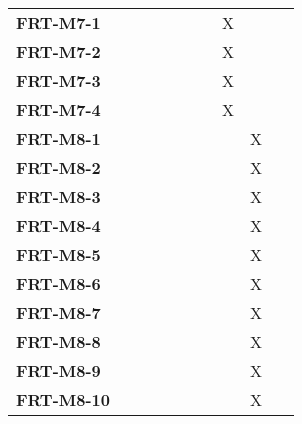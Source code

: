 \documentclass[12pt, titlepage]{article}
\begin{document}
\begin{longtable}{|l|ccccccc|}
	\textbf{FRT-M7-1}  & ~                                        & ~           & ~           & ~           & X           & ~           & ~           \\
	\textbf{FRT-M7-2}  & ~                                        & ~           & ~           & ~           & X           & ~           & ~           \\
	\textbf{FRT-M7-3}  & ~                                        & ~           & ~           & ~           & X           & ~           & ~           \\
	\textbf{FRT-M7-4}  & ~                                        & ~           & ~           & ~           & X           & ~           & ~           \\
	\textbf{FRT-M8-1}  & ~                                        & ~           & ~           & ~           & ~           & X           & ~           \\
	\textbf{FRT-M8-2}  & ~                                        & ~           & ~           & ~           & ~           & X           & ~           \\
	\textbf{FRT-M8-3}  & ~                                        & ~           & ~           & ~           & ~           & X           & ~           \\
	\textbf{FRT-M8-4}  & ~                                        & ~           & ~           & ~           & ~           & X           & ~           \\
	\textbf{FRT-M8-5}  & ~                                        & ~           & ~           & ~           & ~           & X           & ~           \\
	\textbf{FRT-M8-6}  & ~                                        & ~           & ~           & ~           & ~           & X           & ~           \\
	\textbf{FRT-M8-7}  & ~                                        & ~           & ~           & ~           & ~           & X           & ~           \\
	\textbf{FRT-M8-8}  & ~                                        & ~           & ~           & ~           & ~           & X           & ~           \\
	\textbf{FRT-M8-9}  & ~                                        & ~           & ~           & ~           & ~           & X           & ~           \\
	\textbf{FRT-M8-10} & ~                                        & ~           & ~           & ~           & ~           & X           & ~           \\

\end{longtable}
\end{document}
